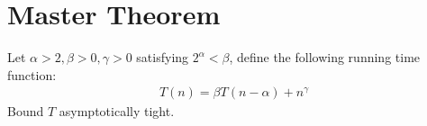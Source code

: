 %
\section{Master Theorem}
Let $\alpha > 2, \beta > 0, \gamma > 0$ satisfying $2^{\alpha} < \beta$, define the following running time function:
\begin{equation*}
  \begin{split}
    T(n) = \beta T(n - \alpha) + n^{\gamma}
  \end{split}
\end{equation*}
Bound $T$ asymptotically tight.

